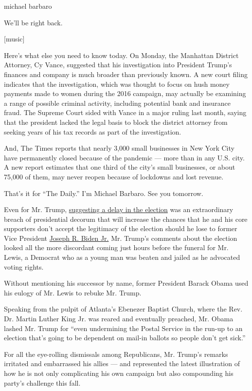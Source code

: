 michael barbaro

We'll be right back.

{[}music{]}

Here's what else you need to know today. On Monday, the Manhattan
District Attorney, Cy Vance, suggested that his investigation into
President Trump's finances and company is much broader than previously
known. A new court filing indicates that the investigation, which was
thought to focus on hush money payments made to women during the 2016
campaign, may actually be examining a range of possible criminal
activity, including potential bank and insurance fraud. The Supreme
Court sided with Vance in a major ruling last month, saying that the
president lacked the legal basis to block the district attorney from
seeking years of his tax records as part of the investigation.

And, The Times reports that nearly 3,000 small businesses in New York
City have permanently closed because of the pandemic --- more than in
any U.S. city. A new report estimates that one third of the city's small
businesses, or about 75,000 of them, may never reopen because of
lockdowns and lost revenue.

That's it for ``The Daily.'' I'm Michael Barbaro. See you tomorrow.

Even for Mr. Trump,
\href{https://twitter.com/realDonaldTrump/status/1288818160389558273?s=20}{suggesting
a delay in the election} was an extraordinary breach of presidential
decorum that will increase the chances that he and his core supporters
don't accept the legitimacy of the election should he lose to former
Vice President
\href{https://www.nytimes.com/interactive/2020/us/elections/joe-biden.html}{Joseph
R. Biden Jr.} Mr. Trump's comments about the election looked all the
more discordant coming just hours before the funeral for Mr. Lewis, a
Democrat who as a young man was beaten and jailed as he advocated voting
rights.

Without mentioning his successor by name, former President Barack Obama
used his eulogy of Mr. Lewis to rebuke Mr. Trump.

Speaking from the pulpit of Atlanta's Ebenezer Baptist Church, where the
Rev. Dr. Martin Luther King Jr. was reared and eventually preached, Mr.
Obama lashed Mr. Trump for ``even undermining the Postal Service in the
run-up to an election that's going to be dependent on mail-in ballots so
people don't get sick.''

For all the eye-rolling dismissals among Republicans, Mr. Trump's
remarks irritated and embarrassed his allies --- and represented the
latest illustration of how he is not only complicating his own campaign
but also compounding his party's challenge this fall.

